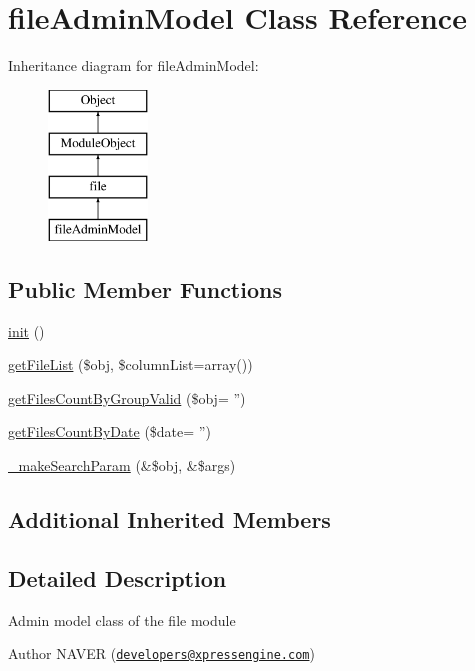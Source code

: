 \hypertarget{classfileAdminModel}{\section{file\+Admin\+Model Class Reference}
\label{classfileAdminModel}
}
Inheritance diagram for file\+Admin\+Model\+:\begin{figure}[H]
\begin{center}
\leavevmode
\includegraphics[height=4.000000cm]{classfileAdminModel}
\end{center}
\end{figure}
\subsection*{Public Member Functions}
\begin{DoxyCompactItemize}
\item 
\hyperlink{classfileAdminModel_a043ae7934f6fb3bb6ef24bff36a63795}{init} ()
\item 
\hyperlink{classfileAdminModel_a19433395ef400eaf33876d93db918a29}{get\+File\+List} (\$obj, \$column\+List=array())
\item 
\hyperlink{classfileAdminModel_a0523b70f599166913414c375318bcc83}{get\+Files\+Count\+By\+Group\+Valid} (\$obj= '')
\item 
\hyperlink{classfileAdminModel_a2cff52618c56e1ebae4e392646c859e8}{get\+Files\+Count\+By\+Date} (\$date= '')
\item 
\hyperlink{classfileAdminModel_a2da869c66512ff677a71674030c8637c}{\+\_\+make\+Search\+Param} (\&\$obj, \&\$args)
\end{DoxyCompactItemize}
\subsection*{Additional Inherited Members}


\subsection{Detailed Description}
Admin model class of the file module \begin{DoxyAuthor}{Author}
N\+A\+V\+E\+R (\href{mailto:developers@xpressengine.com}{\tt developers@xpressengine.\+com}) 
\end{DoxyAuthor}


